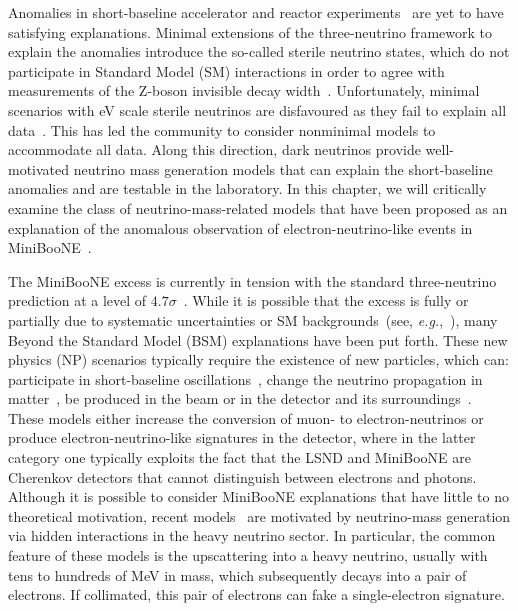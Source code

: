 \graphicspath{{}{miniboone/figs/}{miniboone/}{Diagrams/}}

Anomalies in short-baseline accelerator and reactor experiments~\cite{Athanassopoulos:1996jb,Aguilar:2001ty,AguilarArevalo:2007it,Aguilar-Arevalo:2018gpe} are yet to have satisfying explanations. Minimal extensions of the three-neutrino framework to explain the anomalies introduce the so-called sterile neutrino states, which do not participate in Standard Model (SM) interactions in order to agree with measurements of the Z-boson invisible decay width~\cite{ALEPH:2010aa}. Unfortunately, minimal scenarios with eV scale sterile neutrinos are disfavoured as they fail to explain all data~\cite{Collin:2016aqd, Capozzi:2016vac, Dentler:2018sju}. This has led the community to consider nonminimal models to accommodate all data. Along this direction, dark neutrinos provide well-motivated neutrino mass generation models that can explain the short-baseline anomalies and are testable in the laboratory. In this chapter, we will critically examine the class of neutrino-mass-related models that have been proposed as an explanation of the anomalous observation of electron-neutrino-like events in MiniBooNE~\cite{Aguilar-Arevalo:2018gpe}.

The MiniBooNE excess is currently in tension with the standard three-neutrino prediction at a level of $4.7 \sigma$~\cite{Aguilar-Arevalo:2018gpe}. While it is possible that the excess is fully or partially due to systematic uncertainties or SM backgrounds~(see, \textit{e.g.},~\cite{AguilarArevalo:2008rc,Aguilar-Arevalo:2012fmn,Hill:2010zy}), many Beyond the Standard Model (BSM) explanations have been put forth. These new physics (NP) scenarios typically require the existence of new particles, which can: participate in short-baseline oscillations~\cite{Murayama:2000hm,Strumia:2002fw,  Barenboim:2002ah, GonzalezGarcia:2003jq, Barger:2003xm,Sorel:2003hf, Barenboim:2004wu, Zurek:2004vd, Kaplan:2004dq, Pas:2005rb, deGouvea:2006qd,Schwetz:2007cd, Farzan:2008zv, Hollenberg:2009ws,Nelson:2010hz, Akhmedov:2010vy, Diaz:2010ft, Bai:2015ztj, Giunti:2015mwa, Liao:2016reh, Papoulias:2016edm, Moss:2017pur, Carena:2017qhd}, change the neutrino propagation in matter~\cite{Liao:2016reh, Liao:2018mbg,Asaadi:2017bhx,Doring:2018cob}, be produced in the beam or in the detector and its surroundings~\cite{Gninenko:2009ks,Gninenko:2010pr,Dib:2011jh,McKeen:2010rx,Masip:2012ke, Masip:2011qb,Gninenko:2012rw,Magill:2018jla}. These models either increase the conversion of muon- to electron-neutrinos or produce electron-neutrino-like signatures in the detector, where in the latter category one typically exploits the fact that the LSND and MiniBooNE are Cherenkov detectors that cannot distinguish between electrons and photons. Although it is possible to consider MiniBooNE explanations that have little to no theoretical motivation, recent models~\cite{Bertuzzo:2018itn,Bertuzzo:2018ftf,Ballett:2018ynz} are motivated by neutrino-mass generation via hidden interactions in the heavy neutrino sector. In particular, the common feature of these models is the upscattering into a heavy neutrino, usually with tens to hundreds of MeV in mass, which subsequently decays into a pair of electrons. If collimated, this pair of electrons can fake a single-electron signature.


